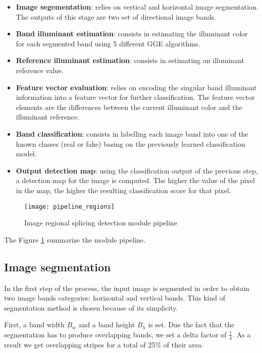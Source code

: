 \begin{itemize}
\item \textbf{Image segementation}: relies on vertical and horizontal image segmentation. The outputs of this stage are two set of directional image bands. 
\item \textbf{Band illuminant estimation}: consists in estimating the illuminant color for each segmented band using 5 different GGE algorithms.
\item \textbf{Reference illuminant estimation}: consists in estimating an illuminant reference value.
\item \textbf{Feature vector evaluation}: relies on encoding the singular band illuminant information into a feature vector for further classification. The feature vector elements are the differences between the current illuminant color and the illuminant reference.
\item \textbf{Band classification}: consists in labelling each image band into one of the known classes (real or fake) basing on the previously learned classification model.
\item \textbf{Output detection map}: using the classification output of the previous step, a detection map for the image is computed. The higher the value of the pixel in the map, the higher the resulting classification score for that pixel.
\end{itemize}

\begin{figure}[h!]
  \centering
    \texttt{[image: pipeline\_regions]}
    \caption{Image regional splicing detection module pipeline}
    \label{fig:regionsmodulepipeline}
\end{figure}

The Figure \ref{fig:regionsmodulepipeline} summarize the module pipeline.

\subsection{Image segmentation}

In the first step of the process, the input image is segmented in order to obtain two image bands categories: horizontal and vertical bands. This kind of segmentation method is chosen because of its simplicity.

First, a band width $B_w$ and a band height $B_h$ is set. Due the fact that the segmentation has to produce overlapping bands, we set a delta factor of $\frac{1}{4}$. As a result we get overlapping stripes for a total of 25\% of their area. 

